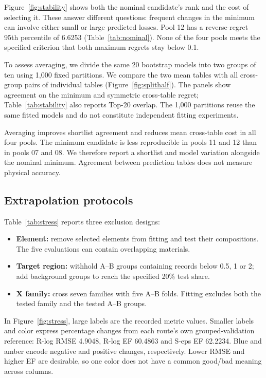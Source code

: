 Figure~\ref{fig:stability} shows both the nominal candidate's rank and the cost of selecting it. These answer different questions: frequent changes in the minimum can involve either small or large predicted losses. Pool 12 has a reverse-regret 95th percentile of 6.6253 (Table~\ref{tab:nominal}). None of the four pools meets the specified criterion that both maximum regrets stay below 0.1.

\FloatBarrier

To assess averaging, we divide the same 20 bootstrap models into two groups of ten using 1,000 fixed partitions. We compare the two mean tables with all cross-group pairs of individual tables (Figure~\ref{fig:splithalf}). The panels show agreement on the minimum and symmetric cross-table regret; Table~\ref{tab:stability} also reports Top-20 overlap. The 1,000 partitions reuse the same fitted models and do not constitute independent fitting experiments.

Averaging improves shortlist agreement and reduces mean cross-table cost in all four pools. The minimum candidate is less reproducible in pools 11 and 12 than in pools 07 and 08. We therefore report a shortlist and model variation alongside the nominal minimum. Agreement between prediction tables does not measure physical accuracy.
\FloatBarrier

\subsection{Extrapolation protocols}
Table~\ref{tab:stress} reports three exclusion designs:
\begin{itemize}
  \item \textbf{Element:} remove selected elements from fitting and test their compositions. The five evaluations can contain overlapping materials.
  \item \textbf{Target region:} withhold A--B groups containing records below 0.5, 1 or 2; add background groups to reach the specified 20\% test share.
  \item \textbf{X family:} cross seven families with five A--B folds. Fitting excludes both the tested family and the tested A--B groups.
\end{itemize}


In Figure~\ref{fig:stress}, large labels are the recorded metric values. Smaller labels and color express percentage changes from each route's own grouped-validation reference: R-log RMSE 4.9048, R-log EF 60.4863 and S-eps EF 62.2234. Blue and amber encode negative and positive changes, respectively. Lower RMSE and higher EF are desirable, so one color does not have a common good/bad meaning across columns.

